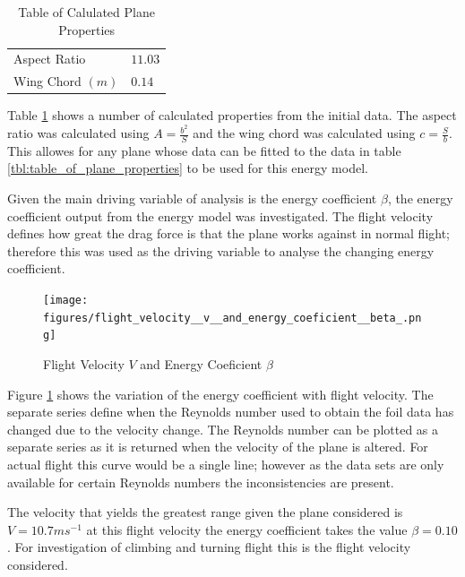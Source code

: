 \documentclass[a4paper,12pt,twoside]{article}
\begin{document}
\begin{table}[width=\textwidth]
\centering

    \begin{tabular}{ll}
    Aspect Ratio	& $11.03$	\\
Wing Chord $(m)$	& $0.14$	\\

    \end{tabular}
\caption{Table of Calulated Plane Properties}
\label{tbl:table_of_calulated_plane_properties}
\end{table}

Table \ref{tbl:table_of_calulated_plane_properties} shows a number of calculated properties from the initial data. The aspect ratio was calculated using  $A = \frac{b^2}{S}$ and the wing chord was calculated using $c = \frac{S}{b}$. This allowes for any plane whose data can be fitted to the data in table \ref{tbl:table_of_plane_properties} to be used for this energy model.

Given the main driving variable of analysis is the energy coefficient $\beta$, the energy coefficient output from the energy model was investigated. The flight velocity defines how great the drag force is that the plane works against in normal flight; therefore this was used as the driving variable to analyse the changing energy coefficient.

\begin{figure}
\centering
\texttt{[image: figures/flight\_velocity\_\_v\_\_and\_energy\_coeficient\_\_beta\_.png]} 
\caption{Flight Velocity $V$ and Energy Coeficient $\beta$}
\label{fig:flight_velocity_v_and_energy_coeficient_beta_}
\end{figure}

Figure \ref{fig:flight_velocity_v_and_energy_coeficient_beta_} shows the variation of the energy coefficient with flight velocity. The separate series define when the Reynolds number used to obtain the foil data has changed due to the velocity change. The Reynolds number can be plotted as a separate series as it is returned when the velocity of the plane is altered. For actual flight this curve would be a single line; however as the data sets are only available for certain Reynolds numbers the inconsistencies are present.

The velocity that yields the greatest range given the plane considered is $V = 10.7 ms^{-1}$ at this flight velocity the energy coefficient takes the value $\beta = 0.10$. For investigation of climbing and turning flight this is the flight velocity considered.
\end{document}
